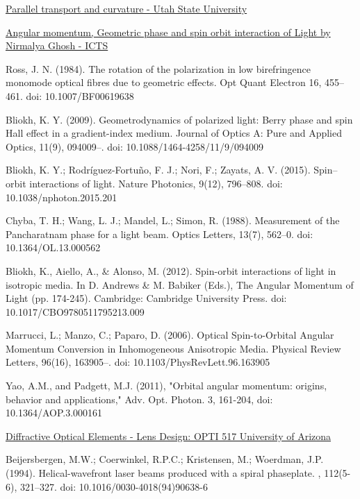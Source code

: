 \documentclass[11pt,a4paper]{article}
\numberwithin{equation}{section}
\begin{document}
\begin{thebibliography}{999}
	  \href{https://www.physics.usu.edu/Wheeler/GenRel2013/Notes/Curvature.pdf}{Parallel transport and curvature - Utah State University}
	  
	  \href{https://www.youtube.com/watch?v=e1ix-oBH5Ng&list=PL04QVxpjcnjjUn4IbvSncV24Uazej5fBI&index=2}{ Angular momentum, Geometric phase and spin orbit interaction of Light by Nirmalya Ghosh - ICTS}
	  
	  Ross, J. N. (1984). The rotation of the polarization in low birefringence monomode optical fibres due to geometric effects. Opt Quant Electron 16, 455–461. doi: 10.1007/BF00619638
	  
	  Bliokh, K. Y. (2009). Geometrodynamics of polarized light: Berry phase and spin Hall effect in a gradient-index medium. Journal of Optics A: Pure and Applied Optics, 11(9), 094009–. doi: 10.1088/1464-4258/11/9/094009
	   
	   Bliokh, K. Y.; Rodríguez-Fortuño, F. J.; Nori, F.; Zayats, A. V. (2015). Spin–orbit interactions of light. Nature Photonics, 9(12), 796–808. doi: 10.1038/nphoton.2015.201 
	  
	  Chyba, T. H.; Wang, L. J.; Mandel, L.; Simon, R. (1988). Measurement of the Pancharatnam phase for a light beam. Optics Letters, 13(7), 562–0. doi: 10.1364/OL.13.000562
	  
	  Bliokh, K., Aiello, A., \& Alonso, M. (2012). Spin-orbit interactions of light in isotropic media. In D. Andrews \& M. Babiker (Eds.), The Angular Momentum of Light (pp. 174-245). Cambridge: Cambridge University Press. doi: 10.1017/CBO9780511795213.009
	  
	  Marrucci, L.; Manzo, C.; Paparo, D. (2006). Optical Spin-to-Orbital Angular Momentum Conversion in Inhomogeneous Anisotropic Media. Physical Review Letters, 96(16), 163905–. doi: 10.1103/PhysRevLett.96.163905  
	  
	  Yao, A.M., and Padgett, M.J. (2011), "Orbital angular momentum: origins, behavior and applications," Adv. Opt. Photon. 3, 161-204, doi: 10.1364/AOP.3.000161
	  
	  \href{https://wp.optics.arizona.edu/jsasian/wp-content/uploads/sites/33/2016/03/L15_OPTI517_DOE.pdf}{Diffractive Optical Elements - Lens Design:  OPTI 517 University of Arizona}
	  
       Beijersbergen, M.W.; Coerwinkel, R.P.C.; Kristensen, M.; Woerdman,  J.P. (1994). Helical-wavefront laser beams produced with a spiral phaseplate. , 112(5-6), 321–327. doi: 10.1016/0030-4018(94)90638-6     
	   
\end{thebibliography}

\clearpage
\newpage 
\thispagestyle{empty}
\vspace{7mm}
\begin{center}
	\vspace*{\fill}%
	\noindent
	\vfill
\end{center}
\end{document}

